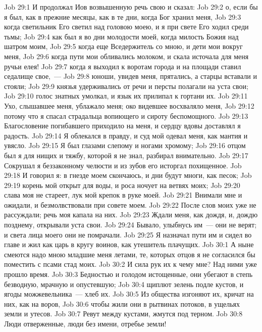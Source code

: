 \vs Job 29:1 И продолжал Иов возвышенную речь свою и сказал:
\vs Job 29:2 о, если бы я был, как в прежние месяцы, как в те дни, когда Бог хранил меня,
\vs Job 29:3 когда светильник Его светил над головою моею, и я при свете Его ходил среди тьмы;
\vs Job 29:4 как был я во дни молодости моей, когда милость Божия  над шатром моим,
\vs Job 29:5 когда еще Вседержитель  со мною, и дети мои вокруг меня,
\vs Job 29:6 когда пути мои обливались молоком, и скала источала для меня ручьи елея!
\vs Job 29:7 когда я выходил к воротам города и на площади ставил седалище свое,~---
\vs Job 29:8 юноши, увидев меня, прятались, а старцы вставали и стояли;
\vs Job 29:9 князья удерживались от речи и персты полагали на уста свои;
\vs Job 29:10 голос знатных умолкал, и язык их прилипал к гортани их.
\vs Job 29:11 Ухо, слышавшее меня, ублажало меня; око видевшее восхваляло меня,
\vs Job 29:12 потому что я спасал страдальца вопиющего и сироту беспомощного.
\vs Job 29:13 Благословение погибавшего приходило на меня, и сердцу вдовы доставлял я радость.
\vs Job 29:14 Я облекался в правду, и суд мой одевал меня, как мантия и увясло.
\vs Job 29:15 Я был глазами слепому и ногами хромому;
\vs Job 29:16 отцом был я для нищих и тяжбу, которой я не знал, разбирал внимательно.
\vs Job 29:17 Сокрушал я беззаконному челюсти и из зубов его исторгал похищенное.
\vs Job 29:18 И говорил я: в гнезде моем скончаюсь, и дни  будут многи, как песок;
\vs Job 29:19 корень мой открыт для воды, и роса ночует на ветвях моих;
\vs Job 29:20 слава моя не стареет, лук мой крепок в руке моей.
\vs Job 29:21 Внимали мне и ожидали, и безмолвствовали при совете моем.
\vs Job 29:22 После слов моих уже не рассуждали; речь моя капала на них.
\vs Job 29:23 Ждали меня, как дождя, и,  дождю позднему, открывали уста свои.
\vs Job 29:24 Бывало, улыбнусь им~--- они не верят; и света лица моего они не помрачали.
\vs Job 29:25 Я назначал пути им и сидел во главе и жил как царь в кругу воинов, как утешитель плачущих.
\vs Job 30:1 А ныне смеются надо мною младшие меня летами, те, которых отцов я не согласился бы поместить с псами стад моих.
\vs Job 30:2 И сила рук их к чему мне? Над ними уже прошло время.
\vs Job 30:3 Бедностью и голодом истощенные, они убегают в степь безводную, мрачную и опустевшую;
\vs Job 30:4 щиплют зелень подле кустов, и ягоды можжевельника~--- хлеб их.
\vs Job 30:5 Из общества изгоняют их, кричат на них, как на воров,
\vs Job 30:6 чтобы жили они в рытвинах потоков, в ущельях земли и утесов.
\vs Job 30:7 Ревут между кустами, жмутся под терном.
\vs Job 30:8 Люди отверженные, люди без имени, отребье земли!
